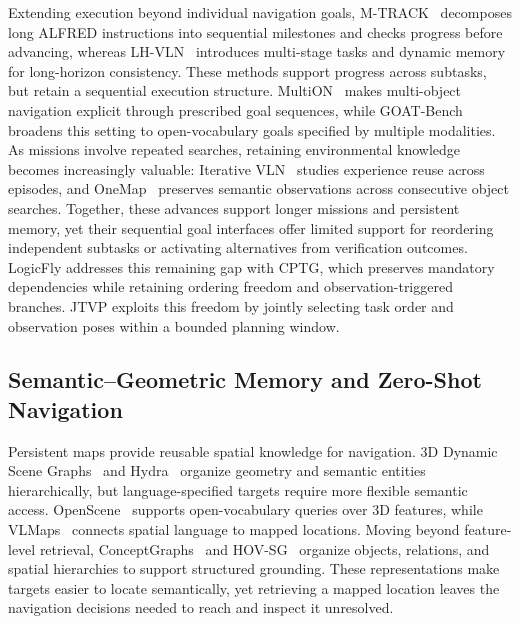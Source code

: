 \documentclass[letterpaper,10pt,journal]{IEEEtran}
\begin{document}
Extending execution beyond individual navigation goals, M-TRACK~\cite{song2022mtrack} decomposes long ALFRED instructions into sequential milestones and checks progress before advancing, whereas LH-VLN~\cite{song2024lhvln} introduces multi-stage tasks and dynamic memory for long-horizon consistency. These methods support progress across subtasks, but retain a sequential execution structure. MultiON~\cite{wani2020multion} makes multi-object navigation explicit through prescribed goal sequences, while GOAT-Bench~\cite{khanna2024goat} broadens this setting to open-vocabulary goals specified by multiple modalities. As missions involve repeated searches, retaining environmental knowledge becomes increasingly valuable: Iterative VLN~\cite{krantz2023ivln} studies experience reuse across episodes, and OneMap~\cite{busch2025onemap} preserves semantic observations across consecutive object searches. Together, these advances support longer missions and persistent memory, yet their sequential goal interfaces offer limited support for reordering independent subtasks or activating alternatives from verification outcomes. LogicFly addresses this remaining gap with CPTG, which preserves mandatory dependencies while retaining ordering freedom and observation-triggered branches. JTVP exploits this freedom by jointly selecting task order and observation poses within a bounded planning window.

\subsection{Semantic--Geometric Memory and Zero-Shot Navigation}

Persistent maps provide reusable spatial knowledge for navigation. 3D Dynamic Scene Graphs~\cite{rosinol2020dsg} and Hydra~\cite{hughes2022hydra} organize geometry and semantic entities hierarchically, but language-specified targets require more flexible semantic access. OpenScene~\cite{peng2023openscene} supports open-vocabulary queries over 3D features, while VLMaps~\cite{huang2023vlmaps} connects spatial language to mapped locations. Moving beyond feature-level retrieval, ConceptGraphs~\cite{gu2024conceptgraphs} and HOV-SG~\cite{werby2024hovsg} organize objects, relations, and spatial hierarchies to support structured grounding. These representations make targets easier to locate semantically, yet retrieving a mapped location leaves the navigation decisions needed to reach and inspect it unresolved.
\end{document}
